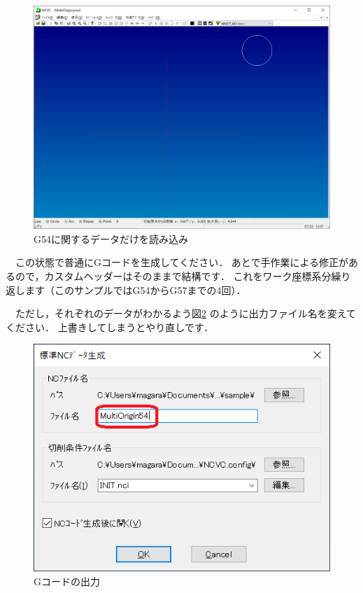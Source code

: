 \begin{figure}[H]
\centering
\includegraphics[scale=0.5]{No3/fig/g54.png}
\caption{G54に関するデータだけを読み込み}
\label{fig:g54}
\end{figure}

　この状態で普通にGコードを生成してください．
あとで手作業による修正があるので，カスタムヘッダーはそのままで結構です．
これをワーク座標系分繰り返します（このサンプルではG54からG57までの4回）．

　ただし，それぞれのデータがわかるよう図\ref{fig:makedlg} のように出力ファイル名を変えてください．
上書きしてしまうとやり直しです．

\begin{figure}[H]
\centering
\includegraphics[scale=0.8]{No3/fig/makedlg.png}
\caption{Gコードの出力}
\label{fig:makedlg}
\end{figure}
